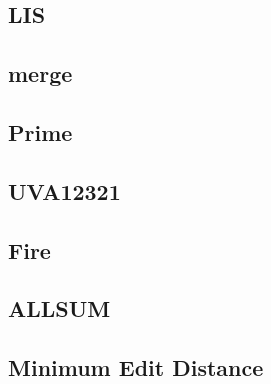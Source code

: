     \subsection{LIS}
        
    \subsection{merge}
          
    \subsection{Prime}
        
    \subsection{UVA12321}
        
    \subsection{Fire}
        
    \subsection{ALLSUM}
        
    \subsection{Minimum Edit Distance}
        

